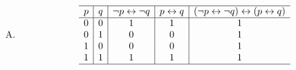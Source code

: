 {{\begin{practices}
\begin{enumerate}[A.]
{\begin{table}[H]
\[\begin{array}{c|c|c|c|c}
                                1 & 1 & 1 & 0 & 1 \\
                                \hline
                            \end{array}
                        \]
                    \end{table}
                }
                \item
                {
                    \begin{table}[H]
                        \[
                            \begin{array}{c|c|c|c|c}
                                \hline
                                p & q & \neg p \leftrightarrow \neg q & p \leftrightarrow q & (\neg p \leftrightarrow \neg q) \leftrightarrow (p \leftrightarrow q) \\
                                \hline
                                0 & 0 & 1 & 1 & 1 \\
                                0 & 1 & 0 & 0 & 1 \\
                                1 & 0 & 0 & 0 & 1 \\
                                1 & 1 & 1 & 1 & 1 \\
                                \hline
                            \end{array}
                        \]
                    \end{table}
                }
            \end{enumerate}
        \end{practices}

}}
